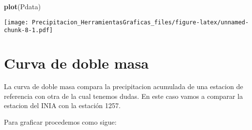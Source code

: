 \documentclass[]{article}
\newenvironment{Shaded}{\begin{snugshade}}{\end{snugshade}}
\newcommand{\CommentTok}[1]{\textcolor[rgb]{0.56,0.35,0.01}{\textit{#1}}}
\newcommand{\DecValTok}[1]{\textcolor[rgb]{0.00,0.00,0.81}{#1}}
\newcommand{\KeywordTok}[1]{\textcolor[rgb]{0.13,0.29,0.53}{\textbf{#1}}}
\newcommand{\NormalTok}[1]{#1}
\newcommand{\OperatorTok}[1]{\textcolor[rgb]{0.81,0.36,0.00}{\textbf{#1}}}
\newcommand{\StringTok}[1]{\textcolor[rgb]{0.31,0.60,0.02}{#1}}
\begin{document}
\begin{Shaded}
\begin{Highlighting}[]
\KeywordTok{plot}\NormalTok{(Pdata)}
\end{Highlighting}
\end{Shaded}

\texttt{[image: Precipitacion\_HerramientasGraficas\_files/figure-latex/unnamed-chunk-8-1.pdf]}

\hypertarget{curva-de-doble-masa}{%
\section{Curva de doble masa}\label{curva-de-doble-masa}}

La curva de doble masa compara la precipitacion acumulada de una
estacion de referencia con otra de la cual tenemos dudas. En este caso
vamos a comparar la estacion del INIA con la estación 1257.

\begin{Shaded}
\end{Shaded}

Para graficar procedemos como sigue:
\end{document}
